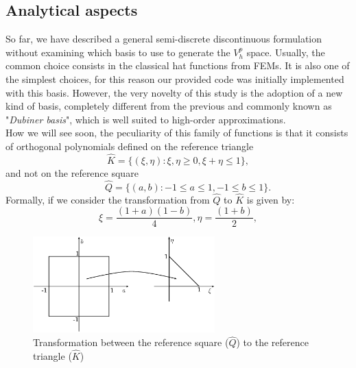 \documentclass[a4paper,11pt]{article}
\begin{document}
    \subsection{Analytical aspects}\label{analytical_aspects}
    So far, we have described a general semi-discrete discontinuous formulation without examining which basis to use to generate the $V_h^p$ space. Usually, the common choice consists in the classical hat functions from FEMs. It is also one of the simplest choices, for this reason our provided code was initially implemented with this basis. However, the very novelty of this study is the adoption of a new kind of basis, completely different from the previous and commonly known as "\emph{Dubiner basis}"\cite{dubiner}, which is well suited to high-order approximations. \\
    How we will see soon, the peculiarity of this family of functions is that it consists of orthogonal polynomials defined on the reference triangle
    \begin{equation*}
    \hat{K}=\{ (\xi, \eta) : \xi, \eta \ge 0,	\xi+\eta \le 1 \},
    \end{equation*}
    and not on the reference square
    \begin{equation*}
    \quad \quad \hat{Q}=\{ (a, b) : -1 \le a \le 1, -1 \le b \le 1 \}.
    \end{equation*}
    Formally, if we consider the transformation from $\hat{Q}$ to $\hat{K}$ is given by:
    \begin{equation}\label{transformation_formula}
    \xi=\frac{(1+a)(1-b)}{4},  \eta=\frac{(1+b)}{2},
    \end{equation}
    
    \begin{figure}[h]
    \begin{center}
    \includegraphics[width = 7cm]{./transformation.png}
    	\caption{Transformation between the reference square ($\hat{Q}$) to the reference triangle ($\hat{K}$)}
    	\label{transformation}
    \end{center}
    \end{figure}
    
\end{document}
